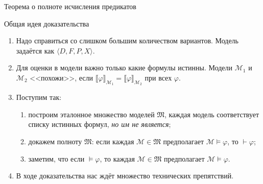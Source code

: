 \documentclass[aspectratio=169]{beamer}
\begin{document}
\begin{frame}


\begin{center}\LARGE Теорема о полноте исчисления предикатов\end{center}

\end{frame}

\begin{frame}{Общая идея доказательства}
\begin{enumerate}
\item Надо справиться со слишком большим количеством вариантов.
      Модель задаётся как $\langle D,F,P,X \rangle$.\pause
\item Для оценки в модели важно только какие формулы истинны.
      Модели $\mathcal{M}_1$ и $\mathcal{M}_2$ <<похожи>>, если
      $\llbracket \varphi \rrbracket_{\mathcal{M}_1} = \llbracket \varphi \rrbracket_{\mathcal{M}_2}$
      при всех $\varphi$.\pause
\item Поступим так:
    \begin{enumerate}
       \item построим эталонное множество моделей $\mathfrak{M}$, каждая модель соответствует списку истинных формул, \emph{но им не является};\pause
       \item докажем полноту $\mathfrak{M}$: если каждая $\mathcal{M} \in \mathfrak{M}$ предполагает $\mathcal{M}\models\varphi$,
             то $\vdash\varphi$;\pause
       \item заметим, что если $\models\varphi$, то каждая $\mathcal{M} \in \mathfrak{M}$ предполагает $\mathcal{M}\models\varphi$.\pause
    \end{enumerate}
\item В ходе доказательства нас ждёт множество технических препятствий.
\end{enumerate}
\end{frame}
\end{document}
